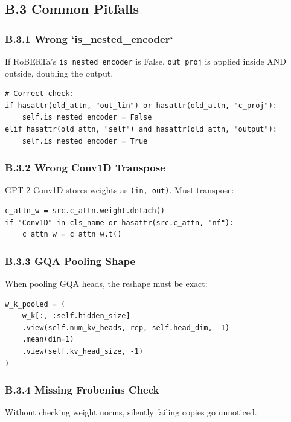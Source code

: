 \subsection{B.3 Common Pitfalls}

\subsubsection{B.3.1 Wrong `is\_nested\_encoder`}

If RoBERTa's \texttt{is\_nested\_encoder} is False, \texttt{out\_proj} is applied inside 
AND outside, doubling the output.

\begin{lstlisting}
# Correct check:
if hasattr(old_attn, "out_lin") or hasattr(old_attn, "c_proj"):
    self.is_nested_encoder = False
elif hasattr(old_attn, "self") and hasattr(old_attn, "output"):
    self.is_nested_encoder = True
\end{lstlisting}

\subsubsection{B.3.2 Wrong Conv1D Transpose}

GPT-2 Conv1D stores weights as \texttt{(in, out)}. Must transpose:

\begin{lstlisting}
c_attn_w = src.c_attn.weight.detach()
if "Conv1D" in cls_name or hasattr(src.c_attn, "nf"):
    c_attn_w = c_attn_w.t()
\end{lstlisting}

\subsubsection{B.3.3 GQA Pooling Shape}

When pooling GQA heads, the reshape must be exact:

\begin{lstlisting}
w_k_pooled = (
    w_k[:, :self.hidden_size]
    .view(self.num_kv_heads, rep, self.head_dim, -1)
    .mean(dim=1)
    .view(self.kv_head_size, -1)
)
\end{lstlisting}

\subsubsection{B.3.4 Missing Frobenius Check}

Without checking weight norms, silently failing copies go unnoticed.

